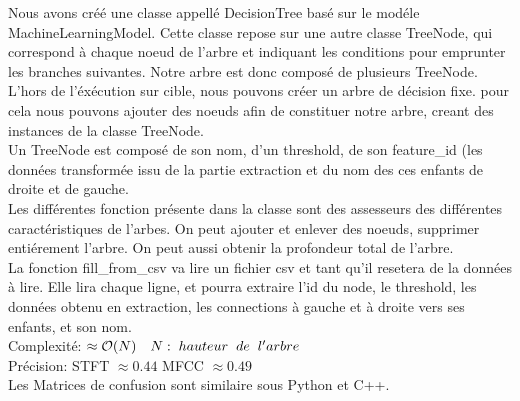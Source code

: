 \documentclass[10pt]{article}
\begin{document}
\begin{minipage}[t]{0.6\linewidth}

Nous avons créé une classe appellé DecisionTree basé sur le modéle MachineLearningModel. Cette classe repose sur une autre classe TreeNode, qui correspond à chaque noeud de l'arbre et indiquant les conditions pour emprunter les branches suivantes. Notre arbre est donc composé de plusieurs TreeNode. \\

L'hors de l'éxécution sur cible, nous pouvons créer un arbre de décision fixe. pour cela nous pouvons ajouter des noeuds afin de constituer notre arbre, creant des instances de la classe TreeNode.\\

Un TreeNode est composé de son nom, d'un threshold, de son feature\_id (les données transformée issu de la partie extraction et du nom des ces enfants de droite et de gauche.\\

Les différentes fonction présente dans la classe sont des assesseurs des différentes caractéristiques de l'arbes. On peut ajouter et enlever des noeuds, supprimer entiérement l'arbre. On peut aussi obtenir la profondeur total de l'arbre. \\
La fonction fill\_from\_csv va lire un fichier csv et tant qu'il resetera de la données à lire. Elle lira chaque ligne, et pourra extraire l'id du node, le threshold, les données obtenu en extraction, les connections à gauche et à droite vers ses enfants, et son nom.\\


Complexité: $\approx \mathcal{O}(N)\quad N: \hspace{0.1cm} hauteur \hspace{0.2cm} de \hspace{0.2cm} l'arbre$ \\
Précision: STFT $\approx 0.44$ MFCC $\approx 0.49$\\
Les Matrices de confusion sont similaire sous Python et C++.
\end{minipage}
\end{document}
